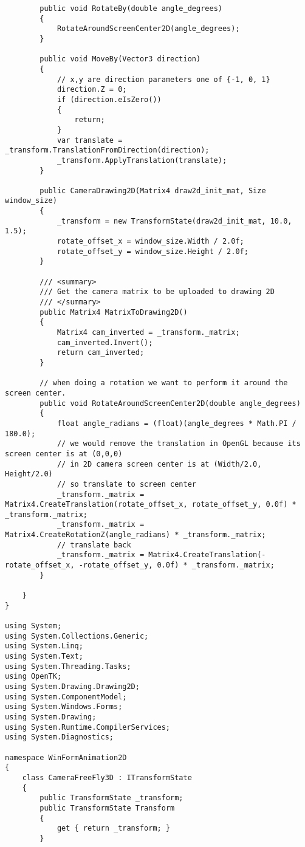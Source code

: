 \begin{scriptsize}
\begin{verbatim}
        public void RotateBy(double angle_degrees)
        {
            RotateAroundScreenCenter2D(angle_degrees);
        }

        public void MoveBy(Vector3 direction)
        {
            // x,y are direction parameters one of {-1, 0, 1}
            direction.Z = 0;
            if (direction.eIsZero())
            {
                return;
            }
            var translate = _transform.TranslationFromDirection(direction);
            _transform.ApplyTranslation(translate);
        }

        public CameraDrawing2D(Matrix4 draw2d_init_mat, Size window_size)
        {
            _transform = new TransformState(draw2d_init_mat, 10.0, 1.5);
            rotate_offset_x = window_size.Width / 2.0f;
            rotate_offset_y = window_size.Height / 2.0f;
        }

        /// <summary>
        /// Get the camera matrix to be uploaded to drawing 2D
        /// </summary>
        public Matrix4 MatrixToDrawing2D()
        {
            Matrix4 cam_inverted = _transform._matrix;
            cam_inverted.Invert();
            return cam_inverted;
        }

        // when doing a rotation we want to perform it around the screen center.
        public void RotateAroundScreenCenter2D(double angle_degrees)
        {
            float angle_radians = (float)(angle_degrees * Math.PI / 180.0);
            // we would remove the translation in OpenGL because its screen center is at (0,0,0)
            // in 2D camera screen center is at (Width/2.0, Height/2.0)
            // so translate to screen center 
            _transform._matrix = Matrix4.CreateTranslation(rotate_offset_x, rotate_offset_y, 0.0f) * _transform._matrix;
            _transform._matrix = Matrix4.CreateRotationZ(angle_radians) * _transform._matrix;
            // translate back
            _transform._matrix = Matrix4.CreateTranslation(-rotate_offset_x, -rotate_offset_y, 0.0f) * _transform._matrix;
        }

    }
}

using System;
using System.Collections.Generic;
using System.Linq;
using System.Text;
using System.Threading.Tasks;
using OpenTK;
using System.Drawing.Drawing2D;
using System.ComponentModel;
using System.Windows.Forms;
using System.Drawing;
using System.Runtime.CompilerServices;
using System.Diagnostics;

namespace WinFormAnimation2D
{
    class CameraFreeFly3D : ITransformState
    {
        public TransformState _transform;
        public TransformState Transform
        {
            get { return _transform; }
        }


\end{verbatim}
\end{scriptsize}
